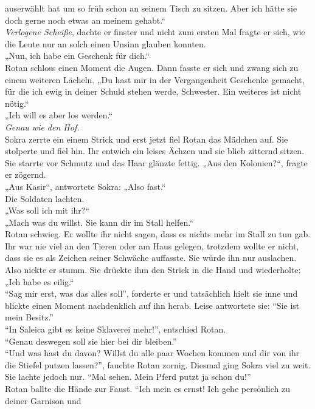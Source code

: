 auserwählt 
hat um so früh schon an seinem Tisch zu sitzen. Aber ich hätte sie doch gerne noch etwas an meinem 
gehabt.“\\
\textit{Verlogene Scheiße}, dachte er finster und nicht zum ersten Mal fragte er sich, wie die 
Leute nur an solch einen Unsinn glauben konnten.\\
„Nun, ich habe ein Geschenk für dich.“\\
Rotan schloss einen Moment die Augen. Dann fasste er sich und zwang sich zu einem weiteren Lächeln. 
„Du hast mir in der Vergangenheit Geschenke gemacht, für die ich ewig in deiner Schuld stehen 
werde, 
Schwester. Ein weiteres ist nicht nötig.“\\
„Ich will es aber los werden.“\\
\textit{Genau wie den Hof.}\\
Sokra zerrte ein einem Strick und erst jetzt fiel Rotan das Mädchen auf. Sie stolperte und fiel 
hin. 
Ihr entwich ein leises Ächzen und sie blieb zitternd sitzen. Sie starrte vor Schmutz und das Haar 
glänzte fettig. „Aus den Kolonien?“, fragte er zögernd.\\
„Aus Kasir“, antwortete Sokra: „Also fast.“\\
Die Soldaten lachten. \\
„Was soll ich mit ihr?“\\
„Mach was du willst. Sie kann dir im Stall helfen.“\\
Rotan schwieg. Er wollte ihr nicht sagen, dass es nichts mehr im Stall zu tun gab. Ihr war nie viel 
an den Tieren oder am Haus gelegen, trotzdem wollte er nicht, dass sie es als Zeichen seiner 
Schwäche auffasste. Sie würde ihn nur auslachen. Also nickte er stumm. Sie drückte ihm den Strick 
in 
die Hand und wiederholte: „Ich habe es eilig.“\\
``Sag mir erst, was das alles soll'', forderte er und tatsächlich hielt sie inne und blickte einen 
Moment nachdenklich auf ihn herab. Leise antwortete sie: ``Sie ist mein Besitz.''\\
``In Saleica gibt es keine Sklaverei mehr!'', entschied Rotan.\\
``Genau deswegen soll sie hier bei dir bleiben.''\\
``Und was hast du davon? Willst du alle paar Wochen kommen und dir von ihr die Stiefel putzen 
lassen?'', fauchte Rotan zornig. Diesmal ging Sokra viel zu weit.\\
Sie lachte jedoch nur. ``Mal sehen. Mein Pferd putzt ja schon du!''\\
Rotan ballte die Hände zur Faust. ``Ich mein es ernst! Ich gehe persönlich zu deiner Garnison und 
